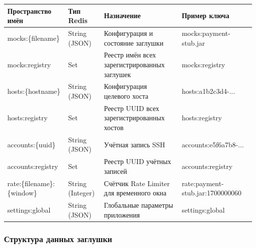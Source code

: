 \documentclass[
]{article}
\newcounter{none} %
\begin{document}
{\def\LTcaptype{none} %
\begin{longtable}[]{@{}
  >{\raggedright\arraybackslash}p{}
  >{\raggedright\arraybackslash}p{}
  >{\raggedright\arraybackslash}p{}
  >{\raggedright\arraybackslash}p{}@{}}
\toprule\noalign{}
\begin{minipage}[b]{\linewidth}\centering
\textbf{Пространство имён}
\end{minipage} & \begin{minipage}[b]{\linewidth}\centering
\textbf{Тип Redis}
\end{minipage} & \begin{minipage}[b]{\linewidth}\centering
\textbf{Назначение}
\end{minipage} & \begin{minipage}[b]{\linewidth}\centering
\textbf{Пример ключа}
\end{minipage} \\
\midrule\noalign{}
\endhead
\bottomrule\noalign{}
\endlastfoot
mocks:\{filename\} & String (JSON) & Конфигурация и состояние заглушки &
mocks:payment-stub.jar \\
mocks:registry & Set & Реестр имён всех зарегистрированных заглушек &
mocks:registry \\
hosts:\{hostname\} & String (JSON) & Конфигурация целевого хоста &
hosts:a1b2c3d4-... \\
hosts:registry & Set & Реестр UUID всех зарегистрированных хостов &
hosts:registry \\
accounts:\{uuid\} & String (JSON) & Учётная запись SSH &
accounts:e5f6a7b8-... \\
accounts:registry & Set & Реестр UUID учётных записей &
accounts:registry \\
rate:\{filename\}:\{window\} & String (Integer) & Счётчик Rate Limiter
для временного окна & rate:payment-stub.jar:1700000060 \\
settings:global & String (JSON) & Глобальные параметры приложения &
settings:global \\
\end{longtable}
}

\subsubsection{Структура данных
заглушки}\label{ux441ux442ux440ux443ux43aux442ux443ux440ux430-ux434ux430ux43dux43dux44bux445-ux437ux430ux433ux43bux443ux448ux43aux438}
\end{document}
